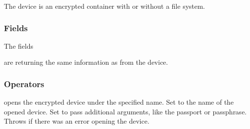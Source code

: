 %


The  device is an encrypted container with or without a
file system.

\subsubsection*{Fields}

The fields 
\begin{inparaitem}
\item {}
\item {}
\item {}
\item {}
\end{inparaitem}
are returning the same information as from the  device.

\subsubsection*{Operators}

opens the encrypted device under the specified name.
Set  to the name of the opened device.
Set  to pass additional arguments, like the passport or passphrase.
Throws  if there was an error opening the device.

